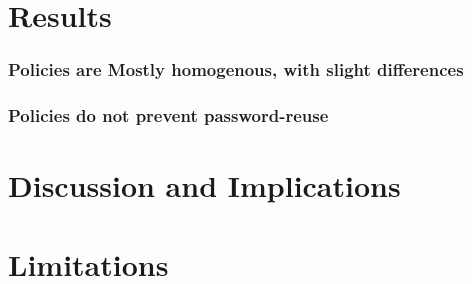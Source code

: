 \section{Results}
\subsubsection{Policies are Mostly homogenous, with slight differences}
\subsubsection{Policies do not prevent password-reuse}

\section{Discussion and Implications}

\section{Limitations}
